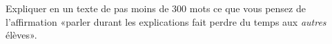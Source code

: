 
\begin{exercice}\label{exosmath-0459}

    Expliquer en un texte de pas moins de \( 300\) mots ce que vous pensez de l'affirmation «parler durant les explications fait perdre du temps aux \emph{autres} élèves».

\end{exercice}
